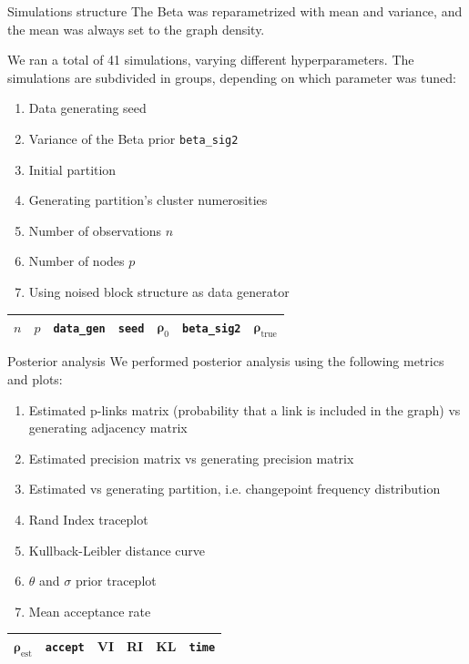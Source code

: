 \begin{frame}{Simulations structure}
The Beta was reparametrized with mean and variance, and the mean was always set to the graph density.

We ran a total of 41 simulations, varying different hyperparameters. 
The simulations are subdivided in groups, depending on which parameter was tuned:
    \begin{enumerate}
        \item Data generating \alert{seed}
        \item Variance of the Beta prior \texttt{beta\_sig2}
        \item Initial partition
        \item Generating partition's \alert{cluster numerosities}
        \item Number of observations $n$
        \item Number of \alert{nodes} $p$
        \item Using \alert{noised} block structure as data generator
    \end{enumerate}

\begin{table}[H]
\centering
\begin{tabular}{lllllll}
\cmidrule(l{3pt}r{3pt}){1-7} 
$n$ & $p$ & \texttt{data\_gen} & \texttt{seed} & $\bm{\rho}_0$ & \texttt{beta\_sig2} & $\bm{\rho}_{\text{true}}$ \\
\midrule
\end{tabular}
\end{table}
\end{frame}


\begin{frame}{Posterior analysis}
We performed posterior analysis using the following metrics and plots:
    \begin{enumerate}
        \item Estimated \alert{p-links} matrix (probability that a link is included in the graph) vs generating adjacency matrix
        \item Estimated \alert{precision matrix} vs generating precision matrix
        \item Estimated vs generating partition, i.e. \alert{changepoint frequency} distribution
        \item Rand Index traceplot
        \item \alert{Kullback-Leibler} distance curve
        \item $\theta$ and $\sigma$ prior traceplot
        \item Mean acceptance rate
    \end{enumerate}

\begin{table}[H]
\centering
\begin{tabular}{llllll}
\cmidrule(l{3pt}r{3pt}){1-6} 
$\bm{\rho}_{\text{est}}$ & \texttt{accept} & VI & RI & KL & \texttt{time}\\
\midrule
\end{tabular}
\end{table}
\end{frame}


